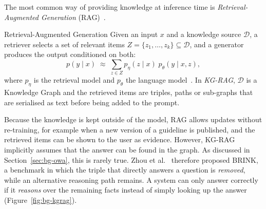 The most common way of providing knowledge at inference time is
\emph{Retrieval-Augmented Generation} (RAG)~\cite{lewis2020retrieval}.

\begin{bgdefinition}{Retrieval-Augmented Generation}
Given an input $x$ and a knowledge source $\mathcal{D}$, a retriever selects
a set of relevant items $Z = \{z_1, \dots, z_k\} \subseteq \mathcal{D}$, and
a generator produces the output conditioned on both:
\[
  p(y \mid x) \;\approx\; \sum_{z \in Z} p_{\eta}(z \mid x)\; p_{\theta}(y \mid x, z),
\]
where $p_{\eta}$ is the retrieval model and $p_{\theta}$ the language
model~\cite{lewis2020retrieval}. In \emph{KG-RAG}, $\mathcal{D}$ is a
Knowledge Graph and the retrieved items are triples, paths or sub-graphs that
are serialised as text before being added to the prompt.
\end{bgdefinition}

Because the knowledge is kept outside of the model, RAG allows updates
without re-training, for example when a new version of a guideline is
published, and the retrieved items can be shown to the user as evidence.
However, KG-RAG implicitly assumes that the answer can be found in the graph.
As discussed in Section~\ref{sec:bg-owa}, this is rarely true. Zhou et
al.~\cite{zhou2026breaks} therefore proposed BRINK, a benchmark in which the
triple that directly answers a question is \emph{removed}, while an
alternative reasoning path remains. A system can only answer correctly if it
\emph{reasons} over the remaining facts instead of simply looking up the
answer (Figure~\ref{fig:bg-kgrag}).


